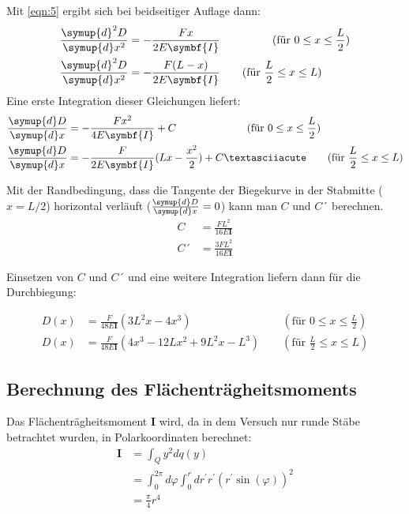 Mit \autoref{eqn:5} ergibt sich bei beidseitiger Auflage dann:
\begin{align}
    \frac{ \symup{d}^{ 2 }D }{ \symup{d}x^{ 2 } } &= - \frac{F x}{2 E \symbf{I}}  \qquad \qquad \; \; \,
    (\text{für } 0 \leq x \leq \frac{L}{2})\\
	\frac{ \symup{d}^{ 2 }D }{ \symup{d}x^{ 2 } } &= - \frac{F (L-x)}{2 E \symbf{I}} \qquad (\text{für } \frac{L}{2} \leq x \leq L)
\end{align}
Eine erste Integration dieser Gleichungen liefert:
\begin{align}
    \frac{ \symup{d}D }{ \symup{d}x } &= - \frac{F x^{2}}{4 E \symbf{I}} + C \qquad \qquad \qquad \; \; \,
    (\text{für } 0 \leq x \leq \frac{L}{2})\\
	\frac{ \symup{d}D }{ \symup{d}x } &= - \frac{F }{2 E \symbf{I}} (Lx - \frac{x^{2}}{2})+C´ \qquad (\text{für } \frac{L}{2} \leq x \leq L)
\end{align}

Mit der Randbedingung, dass die Tangente der Biegekurve in der Stabmitte ($x=L/2$) horizontal verläuft ($\frac{ \symup{d}D }{ \symup{d}x }=0$) kann man $C$ und $C´$ berechnen. 
\begin{align}
    C &= \frac{F L^{2}}{16 E \symbf{I}}  \\
    C´ &= \frac{3F L^{2}}{16 E \symbf{I}}  
    \label{eqn:c}
\end{align}

Einsetzen von $C$ und $C´$ und eine weitere Integration liefern dann für die Durchbiegung:

\begin{align}
    D(x) &= \frac{F}{48 E \symbf{I}} \left(3 L^2 x - 4 x^3 \right) 
    \qquad \qquad \qquad \qquad \: (\text{für } 0 \leq x \leq \frac{L}{2}) \\
    D(x) &= \frac{F}{48 E \symbf{I}} \left(4 x^3 - 12 L x^2 + 9 L^2 x - L^3 \right) 
    \qquad (\text{für } \frac{L}{2} \leq x \leq L)
    \label{eqn:beidseitig}
\end{align}


\subsection{Berechnung des Flächenträgheitsmoments}
\label{sec:flaechentraegheitsmoment}
Das Flächenträgheitsmoment $\mathbf{I}$ wird, da in dem Versuch nur runde Stäbe betrachtet wurden,
in Polarkoordinaten berechnet:
\begin{align}
	\mathbf{I} 
	&= \int_Q y^2 dq(y) 
	\\
	&= \int_0^{2\pi} d\varphi \int_0^r dr^\prime r^\prime 
	\left( r^\prime\sin(\varphi) \right)^2
	\\
	&= \frac{\pi}{4} r^4
\end{align}

\cite{sample}
